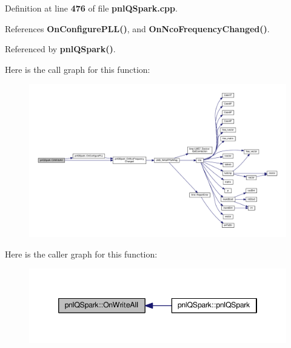 Definition at line {\bf 476} of file {\bf pnl\+Q\+Spark.\+cpp}.



References {\bf On\+Configure\+P\+L\+L()}, and {\bf On\+Nco\+Frequency\+Changed()}.



Referenced by {\bf pnl\+Q\+Spark()}.



Here is the call graph for this function\+:
\nopagebreak
\begin{figure}[H]
\begin{center}
\leavevmode
\includegraphics[width=350pt]{d5/d92/classpnlQSpark_af88d796ea159c52bea44f564e89cfe99_cgraph}
\end{center}
\end{figure}




Here is the caller graph for this function\+:
\nopagebreak
\begin{figure}[H]
\begin{center}
\leavevmode
\includegraphics[width=346pt]{d5/d92/classpnlQSpark_af88d796ea159c52bea44f564e89cfe99_icgraph}
\end{center}
\end{figure}


